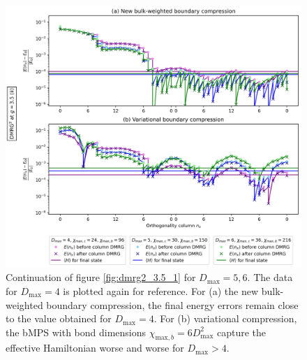 \newpage
\vspace*{\fill}
\begin{figure}[H]
  \centering
  \includegraphics[width=1.0\linewidth]{dmrg_6_6_3.5_2.png}
  \caption{Continuation of figure \ref{fig:dmrg2_3.5_1} for $D_{\text{max}} = 5, 6$. The data for $D_{\text{max}} = 4$ is plotted again for reference. For (a) the new bulk-weighted boundary compression, the final energy errors remain close to the value obtained for $D_{\text{max}} = 4$. For (b) variational compression, the bMPS with bond dimensions $\chi_{\text{max},b} = 6D_{\text{max}}^2$ capture the effective Hamiltonian worse and worse for $D_{\text{max}} > 4$.}
 \label{fig:dmrg2_3.5_2}
\end{figure}
\vspace*{\fill}

